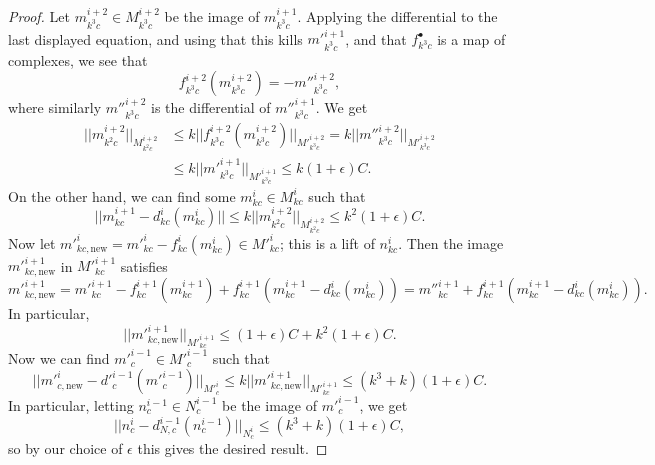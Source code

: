 \begin{proof}
Let $m^{i+2}_{k^3c}\in M^{i+2}_{k^3c}$ be the image of $m^{i+1}_{k^3c}$. Applying the differential to the last displayed equation, and using that this kills $m'^{i+1}_{k^3c}$, and that $f^\bullet_{k^3c}$ is a map of complexes, we see that
\[
f^{i+2}_{k^3c}(m^{i+2}_{k^3c}) = -m''^{i+2}_{k^3c},
\]
where similarly $m''^{i+2}_{k^3c}$ is the differential of $m''^{i+1}_{k^3c}$. We get
\[\begin{aligned}
||m^{i+2}_{k^2c}||_{M^{i+2}_{k^2c}}&\leq k||f^{i+2}_{k^3c}(m^{i+2}_{k^3c})||_{M'^{i+2}_{k^3c}} = k||m''^{i+2}_{k^3c}||_{M'^{i+2}_{k^3c}}\\
&\leq k||m'^{i+1}_{k^3c}||_{M'^{i+1}_{k^3c}}\leq k(1+\epsilon)C.
\end{aligned}\]
On the other hand, we can find some $m^i_{kc}\in M^i_{kc}$ such that
\[
||m^{i+1}_{kc}-d^i_{kc}(m^i_{kc})||\leq k||m^{i+2}_{k^2c}||_{M^{i+2}_{k^2c}}\leq k^2(1+\epsilon)C.
\]
Now let $m'^i_{kc,\mathrm{new}} = m'^i_{kc}-f^i_{kc}(m^i_{kc})\in M'^i_{kc}$; this is a lift of $n^i_{kc}$. Then the image $m'^{i+1}_{kc,\mathrm{new}}$ in $M'^{i+1}_{kc}$ satisfies
\[
m'^{i+1}_{kc,\mathrm{new}} = m'^{i+1}_{kc}-f^{i+1}_{kc}(m^{i+1}_{kc}) + f^{i+1}_{kc}(m^{i+1}_{kc}-d^i_{kc}(m^i_{kc})) = m''^{i+1}_{kc} + f^{i+1}_{kc}(m^{i+1}_{kc}-d^i_{kc}(m^i_{kc})).
\]
In particular,
\[
||m'^{i+1}_{kc,\mathrm{new}}||_{M'^{i+1}_{kc}}\leq (1+\epsilon)C+ k^2(1+\epsilon)C.
\]
Now we can find $m'^{i-1}_c\in M'^{i-1}_c$ such that
\[
||m'^i_{c,\mathrm{new}} - d'^{i-1}_c(m'^{i-1}_c)||_{M'^i_c}\leq k||m'^{i+1}_{kc,\mathrm{new}}||_{M'^{i+1}_{kc}}\leq (k^3+k)(1+\epsilon)C.
\]
In particular, letting $n^{i-1}_c\in N^{i-1}_c$ be the image of $m'^{i-1}_c$, we get
\[
||n^i_c - d^{i-1}_{N,c}(n^{i-1}_c)||_{N^i_c}\leq (k^3+k)(1+\epsilon)C,
\]
so by our choice of $\epsilon$ this gives the desired result.
\end{proof}





